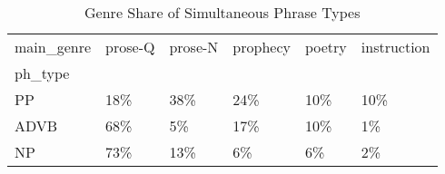 \begin{table}[htbp!]
\centering
\caption{Genre Share of Simultaneous Phrase Types}
\label{table:simgenph_pc}
\begin{tabular}{llllll}
\toprule
main\_genre & prose-Q & prose-N & prophecy & poetry & instruction \\
ph\_type &         &         &          &        &             \\
\midrule
PP      &     18\% &     38\% &      24\% &    10\% &         10\% \\
ADVB    &     68\% &      5\% &      17\% &    10\% &          1\% \\
NP      &     73\% &     13\% &       6\% &     6\% &          2\% \\
\bottomrule
\end{tabular}
\end{table}

